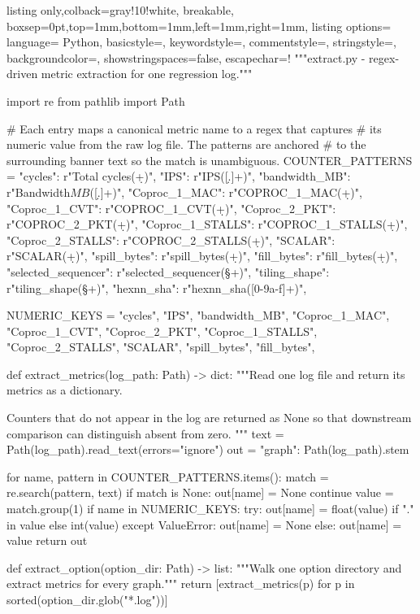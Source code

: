 \begin{tcblisting}{listing only,colback=gray!10!white, breakable, boxsep=0pt,top=1mm,bottom=1mm,left=1mm,right=1mm,
listing options={
language= Python,
basicstyle=\small\ttfamily,
keywordstyle=\color{blue},
commentstyle=\color{gray},
stringstyle=\color{violet},
backgroundcolor=\color{gray!25},
showstringspaces=false,
escapechar=!}}
"""extract.py - regex-driven metric extraction for one regression log."""

import re
from pathlib import Path

# Each entry maps a canonical metric name to a regex that captures
# its numeric value from the raw log file. The patterns are anchored
# to the surrounding banner text so the match is unambiguous.
COUNTER_PATTERNS = {
    "cycles":              r"Total cycles\s*[:=]\s*(\d+)",
    "IPS":                 r"IPS\s*[:=]\s*([\d.]+)",
    "bandwidth_MB":        r"Bandwidth\s*\(MB\)\s*[:=]\s*([\d.]+)",
    "Coproc_1_MAC":        r"COPROC_1_MAC\s*[:=]\s*(\d+)",
    "Coproc_1_CVT":        r"COPROC_1_CVT\s*[:=]\s*(\d+)",
    "Coproc_2_PKT":        r"COPROC_2_PKT\s*[:=]\s*(\d+)",
    "Coproc_1_STALLS":     r"COPROC_1_STALLS\s*[:=]\s*(\d+)",
    "Coproc_2_STALLS":     r"COPROC_2_STALLS\s*[:=]\s*(\d+)",
    "SCALAR":              r"SCALAR\s*[:=]\s*(\d+)",
    "spill_bytes":         r"spill_bytes\s*[:=]\s*(\d+)",
    "fill_bytes":          r"fill_bytes\s*[:=]\s*(\d+)",
    "selected_sequencer":  r"selected_sequencer\s*[:=]\s*(\S+)",
    "tiling_shape":        r"tiling_shape\s*[:=]\s*(\S+)",
    "hexnn_sha":           r"hexnn_sha\s*[:=]\s*([0-9a-f]+)",
}

NUMERIC_KEYS = {
    "cycles", "IPS", "bandwidth_MB",
    "Coproc_1_MAC", "Coproc_1_CVT", "Coproc_2_PKT",
    "Coproc_1_STALLS", "Coproc_2_STALLS",
    "SCALAR", "spill_bytes", "fill_bytes",
}


def extract_metrics(log_path: Path) -> dict:
    """Read one log file and return its metrics as a dictionary.

    Counters that do not appear in the log are returned as None so
    that downstream comparison can distinguish absent from zero.
    """
    text = Path(log_path).read_text(errors="ignore")
    out = {"graph": Path(log_path).stem}

    for name, pattern in COUNTER_PATTERNS.items():
        match = re.search(pattern, text)
        if match is None:
            out[name] = None
            continue
        value = match.group(1)
        if name in NUMERIC_KEYS:
            try:
                out[name] = float(value) if "." in value else int(value)
            except ValueError:
                out[name] = None
        else:
            out[name] = value
    return out


def extract_option(option_dir: Path) -> list:
    """Walk one option directory and extract metrics for every graph."""
    return [extract_metrics(p) for p in sorted(option_dir.glob("*.log"))]
\end{tcblisting}

